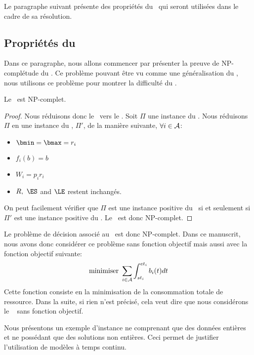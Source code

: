 Le paragraphe suivant présente des propriétés du \CECSP~qui seront 
utilisées dans le cadre de sa résolution. 

\subsection{Propriétés du \CECSP}

Dans ce paragraphe, nous allons commencer par présenter la preuve de
NP-complétude du \CECSP. Ce problème pouvant être vu comme une
généralisation du \CUSP, nous utilisons ce problème pour montrer la
difficulté du \CECSP. 

\begin{theo}
Le \CECSP~est NP-complet.
\end{theo}

\begin{proof}
Nous réduisons donc le \CUSP~vers le \CECSP. Soit $\Pi$ une instance
du \CUSP. Nous réduisons $\Pi$ en une instance du \CECSP, $\Pi'$, de
la manière suivante, $\forall i \in {\cal A}$:
\begin{itemize}
\item $ \bmin=\bmax=r_i$
\item $f_i(b)=b$
\item $W_i=p_ir_i$
\item $R,\ \ES$ and $\LE$ restent inchangés. 
\end{itemize}

On peut facilement vérifier  que $\Pi$ est une instance positive du \CUSP~si
et seulement si $\Pi'$ est une instance positive du \CECSP. Le
\CECSP~est donc NP-complet.
\end{proof}

Le problème de décision associé au \CECSP~est donc NP-complet. Dans ce
manuscrit, nous avons donc considérer ce problème sans fonction
objectif mais aussi avec la fonction objectif suivante: 
\[\text{minimiser } \sum_{i \in {\cal A}} \int_{st_i}^{et_i} b_i(t)dt\]
Cette fonction consiste en la minimisation de la consommation totale
de ressource. Dans la suite, si rien n'est précisé, cela veut dire que
nous considérons le \CECSP~ sans fonction objectif.

Nous présentons un exemple d'instance ne comprenant que des données
entières et ne possédant que des solutions non entières. Ceci permet
de justifier l'utilisation de modèles à temps continu.

